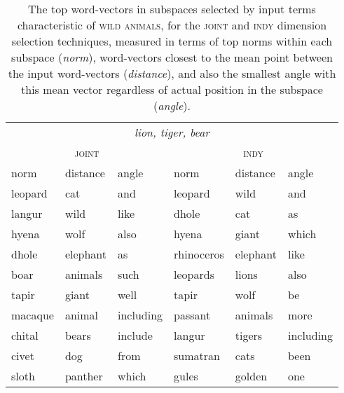 \begin{table}
\centering
\begin{tabular}{lll|lll}
\hline
\multicolumn{6}{c}{\emph{lion, tiger, bear}} \\
\multicolumn{3}{c}{\textsc{joint}} & \multicolumn{3}{c}{\textsc{indy}} \\
\hline
norm & distance & angle & norm & distance & angle \\
\hline
leopard & cat & and & leopard & wild & and \\
langur & wild & like & dhole & cat & as \\
hyena & wolf & also & hyena & giant & which \\
dhole & elephant & as & rhinoceros & elephant & like \\
boar & animals & such & leopards & lions & also \\
tapir & giant & well & tapir & wolf & be \\
macaque & animal & including & passant & animals & more \\
chital & bears & include & langur & tigers & including \\
civet & dog & from & sumatran & cats & been \\
sloth & panther & which & gules & golden & one \\
\hline
\end{tabular}
\caption[Top Wild Animal Word-Vectors]{The top word-vectors in subspaces selected by input terms characteristic of \textsc{wild animals}, for the \textsc{joint} and \textsc{indy} dimension selection techniques, measured in terms of top norms within each subspace (\emph{norm}), word-vectors closest to the mean point between the input word-vectors (\emph{distance}), and also the smallest angle with this mean vector regardless of actual position in the subspace (\emph{angle}).}
\label{tab:tops-wild}
\end{table}

